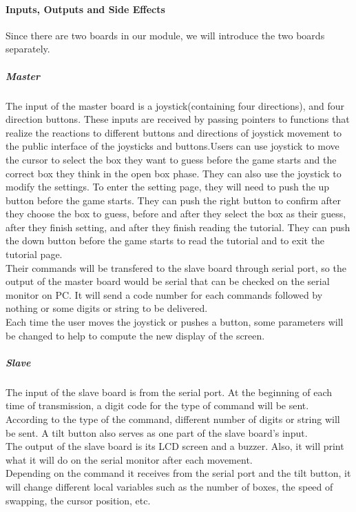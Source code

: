 \paragraph{Inputs, Outputs and Side Effects}
\hfill \newline
Since there are two boards in our module, we will introduce the two boards separately.
\subparagraph{Master}
\hfill \newline
The input of the master board is a joystick(containing four directions), and four direction buttons. These inputs are received by passing pointers to functions that realize the reactions to different buttons and directions of joystick movement to the public interface of the joysticks and buttons.Users can use joystick to move the cursor to select the box they want to guess before the game starts and the correct box they think in the open box phase. They can also use the joystick to modify the settings. To enter the setting page, they will need to push the up button before the game starts. They can push the right button to confirm after they choose the box to guess, before and after they select the box as their guess, after they finish setting, and after they finish reading the tutorial. They can push the down button before the game starts to read the tutorial and to exit the tutorial page. \\
\hfill \newline
Their commands will be transfered to the slave board through serial port, so the output of the master board would be serial that can be checked on the serial monitor on PC. It will send a code number for each commands followed by nothing or some digits or string to be delivered. \\
\hfill \newline
Each time the user moves the joystick or pushes a button, some parameters will be changed to help to compute the new display of the screen.
\subparagraph{Slave}
\hfill \newline
The input of the slave board is from the serial port. At the beginning of each time of transmission, a digit code for the type of command will be sent. According to the type of the command, different number of digits or string will be sent. A tilt button also serves as one part of the slave board's input.\\
\hfill \newline
The output of the slave board is its LCD screen and a buzzer. Also, it will print what it will do on the serial monitor after each movement.\\
\hfill \newline
Depending on the command it receives from the serial port and the tilt button, it will change different local variables such as the number of boxes, the speed of swapping, the cursor position, etc.

